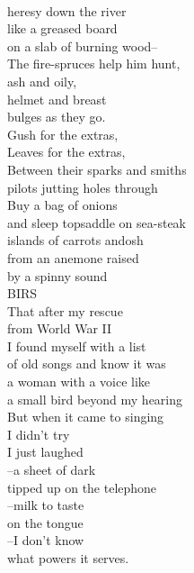 \documentclass[smalldemyvopaper,11pt,twoside,onecolumn,openright,extrafontsizes]{memoir}
\begin{document}
\\heresy down the river
\\like a greased board
\\on a slab of burning wood--
\\The fire-spruces help him hunt,
\\ash and oily,
\\helmet and breast
\\bulges as they go.
\\Gush for the extras,
\\Leaves for the extras,
\\Between their sparks and smiths
\\pilots jutting holes through
\\Buy a bag of onions
\\and sleep topsaddle on sea-steak
\\islands of carrots andosh
\\from an anemone raised
\\by a spinny sound
\\BIRS
\\That after my rescue
\\from World War II
\\I found myself with a list
\\of old songs and know it was
\\a woman with a voice like
\\a small bird beyond my hearing
\\But when it came to singing
\\I didn't try
\\I just laughed
\\--a sheet of dark
\\tipped up on the telephone
\\--milk to taste
\\on the tongue
\\--I don't know
\\what powers it serves.
\end{document}
